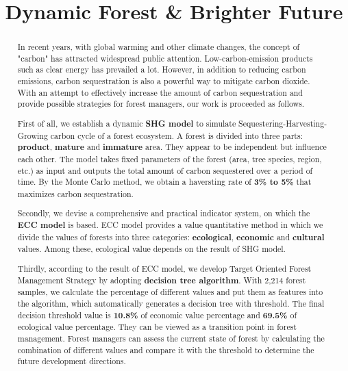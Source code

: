 \documentclass{mcmthesis}
\title{\textbf{Dynamic Forest \& Brighter Future}}
\begin{document}
\begin{abstract}

In recent years, with global warming and other climate changes, the concept of "carbon" has attracted widespread public attention. Low-carbon-emission products such as clear energy has prevailed a lot. However, in addition to reducing carbon emissions, carbon sequestration is also a powerful way to mitigate carbon dioxide. With an attempt to effectively increase the amount of carbon sequestration and provide possible strategies for forest managers, our work is proceeded as follows.

First of all, we establish a dynamic \textbf{SHG model} to simulate Sequestering-Harvesting-Growing carbon cycle of a forest ecosystem. A forest is divided into three parts: \textbf{product}, \textbf{mature} and \textbf{immature} area. They appear to be independent but influence each other. The model takes fixed parameters of the forest (area, tree species, region, etc.) as input and outputs the total amount of carbon sequestered over a period of time. By the Monte Carlo method, we obtain a haversting rate of \textbf{3\% to 5\% }that maximizes carbon sequestration.

Secondly, we devise a comprehensive and practical indicator system, on which the \textbf{ECC model} is based. ECC model provides a value quantitative method in which we divide the values of forests into three categories: \textbf{ecological}, \textbf{economic} and \textbf{cultural} values. Among these, ecological value depends on the result of SHG model.

Thirdly, according to the result of ECC model, we develop Target Oriented Forest Management Strategy by adopting \textbf{decision tree algorithm}. With 2,214 forest samples, we calculate the percentage of different values and put them as features into the algorithm, which automatically generates a decision tree with threshold. The final decision threshold value is \textbf{10.8\%} of economic value percentage and \textbf{69.5\%} of ecological value percentage. They can be viewed as a transition point in forest management. Forest managers can assess the current state of forest by calculating the combination of different values and compare it with the threshold to determine the future development directions. 


\end{abstract}
\end{document}
